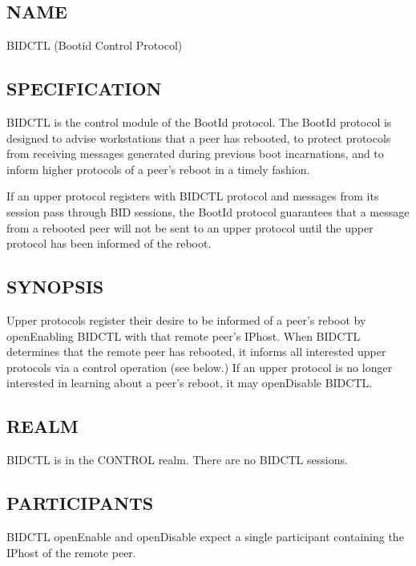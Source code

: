 
%
%

\subsection*{NAME}

\noindent BIDCTL (Bootid Control Protocol)

\subsection*{SPECIFICATION}

BIDCTL is the control module of the BootId protocol. 
The BootId protocol is designed to advise workstations that a peer has
rebooted, to protect protocols from receiving messages generated
during previous boot incarnations, and to inform higher protocols of a
peer's reboot in a timely fashion.

If an upper protocol registers with BIDCTL protocol and messages
from its session pass through BID sessions, the BootId protocol
guarantees that a message from a rebooted peer will not be sent to an
upper protocol until the upper protocol has been informed of the
reboot.  

\subsection*{SYNOPSIS}

\noindent 
Upper protocols register their desire to be informed of a peer's
reboot by openEnabling BIDCTL with that remote peer's IPhost.  When
BIDCTL determines that the remote peer has rebooted, it informs all
interested upper protocols via a control operation (see below.) If an
upper protocol is no longer interested in learning about a peer's
reboot, it may openDisable BIDCTL.

\subsection*{REALM}

BIDCTL is in the CONTROL realm.  There are no BIDCTL sessions.

\subsection*{PARTICIPANTS}

BIDCTL openEnable and openDisable expect a single participant
containing the IPhost of the remote peer.

